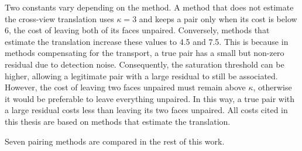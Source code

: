 \documentclass[a4paper, 12pt, twoside]{book}
\begin{document}
Two constants vary depending on the method. A method that does not estimate the cross-view translation uses $\kappa = 3$ and keeps a pair only when its cost is below 6, the cost of leaving both of its faces unpaired. Conversely, methods that estimate the translation increase these values to 4.5 and 7.5. This is because in methods compensating for the transport, a true pair has a small but non-zero residual due to detection noise. Consequently, the saturation threshold can be higher, allowing a legitimate pair with a large residual to still be associated. However, the cost of leaving two faces unpaired must remain above $\kappa$, otherwise it would be preferable to leave everything unpaired. In this way, a true pair with a large residual costs less than leaving its two faces unpaired. All costs cited in this thesis are based on methods that estimate the translation.

Seven pairing methods are compared in the rest of this work.
\end{document}
